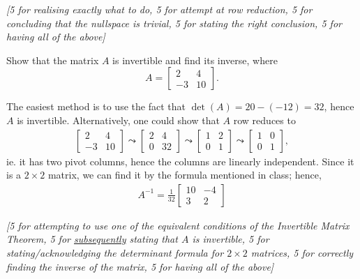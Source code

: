 \documentclass[answers,11pt]{exam}
\theoremstyle{definition}
\DeclareMathOperator{\1}{\mathbbm{1}}
\begin{document}
\begin{questions}
\begin{solution}
	
	\textit{[5 for realising exactly what to do, 5 for attempt at row reduction, 5 for concluding that the nullspace is trivial, 5 for stating the right conclusion, 5 for having all of the above]}
\end{solution}



\question[25] Show that the matrix $A$ is invertible and find its inverse, where
\begin{equation*}
A=\begin{bmatrix}
2&4\\
-3&10
\end{bmatrix}.
\end{equation*}
\addpoints

\begin{solution}
	The easiest method is to use the fact that $\det(A) = 20 - (-12) = 32$, hence $A$ is invertible. Alternatively, one could show that $A$ row reduces to
	\begin{align*}
	\begin{bmatrix}
	2&4\\
	-3&10
	\end{bmatrix} \leadsto \begin{bmatrix}
	2&4\\
	0 &32
	\end{bmatrix} \leadsto \begin{bmatrix}
	1 &2 \\
	0 &1
	\end{bmatrix} \leadsto \begin{bmatrix}
	1 &0 \\
	0 &1
	\end{bmatrix},
	\end{align*}
	ie. it has two pivot columns, hence the columns are linearly independent. Since it is a $2\times 2$ matrix, we can find it by the formula mentioned in class; hence,
	\begin{align*}
	A^{-1} = \frac{1}{32} \begin{bmatrix}
	10 & -4 \\ 3 & 2
	\end{bmatrix}
	\end{align*}
	
	\textit{[5 for attempting to use one of the equivalent conditions of the Invertible Matrix Theorem, 5 for \uline{subsequently} stating that $A$ is invertible, 5 for stating/acknowledging the determinant formula for $2 \times 2 $ matrices, 5 for correctly finding the inverse of the matrix, 5 for having all of the above]}
\end{solution}



\end{questions}
\end{document}
